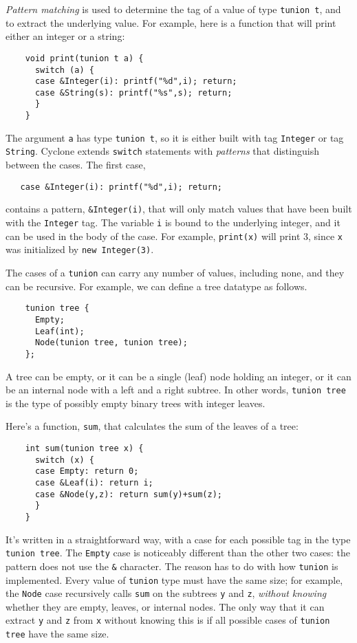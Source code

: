 \emph{Pattern matching} is used to determine the tag of a value of
type \texttt{tunion t}, and to extract the underlying value.  For
example, here is a function that will print either an integer or a
string:
\begin{verbatim}
    void print(tunion t a) {
      switch (a) {
      case &Integer(i): printf("%d",i); return;
      case &String(s): printf("%s",s); return;
      }
    }
\end{verbatim}
The argument \texttt{a} has type \texttt{tunion t}, so it is either
built with tag \texttt{Integer} or tag \texttt{String}.  Cyclone
extends \texttt{switch} statements with \emph{patterns} that
distinguish between the cases.  The first case,
\begin{verbatim}
   case &Integer(i): printf("%d",i); return;
\end{verbatim}
contains a pattern, \texttt{\&Integer(i)}, that will only match values
that have been built with the \texttt{Integer} tag.  The variable
\texttt{i} is bound to the underlying integer, and it can be used in
the body of the case.  For example, \texttt{print(x)} will print 3,
since \texttt{x} was initialized by \texttt{new Integer(3)}.

The cases of a \texttt{tunion} can carry any number of values,
including none, and they can be recursive.  For example, we can define
a tree datatype as follows.
\begin{verbatim}
    tunion tree {
      Empty;
      Leaf(int);
      Node(tunion tree, tunion tree);
    };
\end{verbatim}
A tree can be empty, or it can be a single (leaf) node holding an
integer, or it can be an internal node with a left and a right
subtree.  In other words, \texttt{tunion tree} is the type of possibly
empty binary trees with integer leaves.

Here's a function, \texttt{sum}, that calculates the sum of the leaves
of a tree:
\begin{verbatim}
    int sum(tunion tree x) {
      switch (x) {
      case Empty: return 0;
      case &Leaf(i): return i;
      case &Node(y,z): return sum(y)+sum(z);
      }
    }
\end{verbatim}

It's written in a straightforward way, with a case for each possible
tag in the type \texttt{tunion tree}.  The \texttt{Empty} case is
noticeably different than the other two cases: the pattern does not
use the \texttt{\&} character.  The reason has to do with how
\texttt{tunion} is implemented.  Every value of \texttt{tunion} type
must have the same size; for example, the \texttt{Node} case
recursively calls \texttt{sum} on the subtrees \texttt{y} and
\texttt{z}, \emph{without knowing} whether they are empty, leaves, or
internal nodes.  The only way that it can extract \texttt{y} and
\texttt{z} from \texttt{x} without knowing this is if all possible
cases of \texttt{tunion tree} have the same size.

